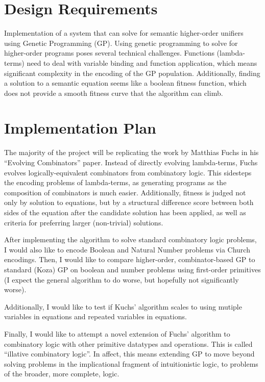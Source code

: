 \documentclass{article}
\begin{document}
\section{Design Requirements}

Implementation of a system that can solve for semantic higher-order unifiers
using Genetic Programming (GP). Using genetic programming to
solve for higher-order programs poses several technical challenges.
Functions (lambda-terms) need to deal with variable binding and
function application, which means significant complexity in the
encoding of the GP population. Additionally, finding a solution to a
semantic equation seems like a boolean fitness function, which does
not provide a smooth fitness curve that the algorithm can climb. 

\section{Implementation Plan}

The majority of the project will be replicating the work by Matthias
Fuchs in his ``Evolving Combinators'' paper. Instead of directly
evolving lambda-terms, Fuchs evolves logically-equivalent combinators
from combinatory logic. This sidesteps the encoding problems of
lambda-terms, as generating programs as the composition of combinators
is much easier. Additionally, fitness is judged not only by solution
to equations, but by a structural difference score between both sides
of the equation after the candidate solution has been applied, as well
as criteria for preferring larger (non-trivial) solutions.

After implementing the algorithm to solve standard combinatory logic
problems, I would also like to encode Boolean and Natural Number
problems via Church encodings. Then, I would like to compare
higher-order, combinator-based GP to standard (Koza) GP on boolean and
number problems using first-order primitives (I expect the general
algorithm to do worse, but hopefully not significantly worse).

Additionally, I would like to test if Kuchs' algorithm scales to using
mutiple variables in equations and repeated variables in equations.

Finally, I would like to attempt a novel extension of Fuchs' algorithm
to combinatory logic with other primitive datatypes and operations.
This is called ``illative combinatory logic''. In affect, this means
extending GP to move beyond solving problems in the implicational
fragment of intuitionistic logic, to problems of the broader, more
complete, logic.
\end{document}
